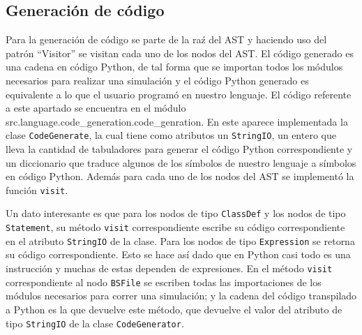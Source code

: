 \subsection{Generaci\'on de c\'odigo}

Para la generaci\'on de c\'odigo se parte de la ra\'z del AST y haciendo uso del patr\'on ``Visitor'' se visitan cada uno de los nodos del AST. El c\'odigo generado es una cadena en c\'odigo Python, de tal forma que se importan todos los m\'odulos necesarios para realizar una simulaci\'on y el c\'odigo Python generado es equivalente a lo que el usuario program\'o en nuestro lenguaje. El c\'odigo referente a este apartado se encuentra en el m\'odulo src.language.code\_generation.code\_genration. En este aparece implementada la clase \verb|CodeGenerate|, la cual tiene como atributos un \verb|StringIO|, un entero que lleva la cantidad de tabuladores para generar el c\'odigo Python correspondiente y un diccionario que traduce algunos de los s\'imbolos de nuestro lenguaje a s\'imbolos en c\'odigo Python. Adem\'as para cada uno de los nodos del AST se implement\'o la funci\'on \verb|visit|. 

Un dato interesante es que para los nodos de tipo \verb|ClassDef| y los nodos de tipo \verb|Statement|, su m\'etodo \verb|visit| correspondiente escribe su c\'odigo correspondiente en el atributo \verb|StringIO| de la clase. Para los nodos de tipo \verb|Expression| se retorna su c\'odigo correspondiente. Esto se hace as\'i dado que en Python casi todo es una instrucci\'on y muchas de estas dependen de expresiones. En el m\'etodo \verb|visit| correspondiente al nodo \verb|BSFile| se escriben todas las importaciones de los m\'odulos necesarios para correr una simulaci\'on; y la cadena del c\'odigo transpilado a Python es la que devuelve este m\'etodo, que devuelve el valor del atributo de tipo \verb|StringIO| de la clase \verb|CodeGenerator|. 

